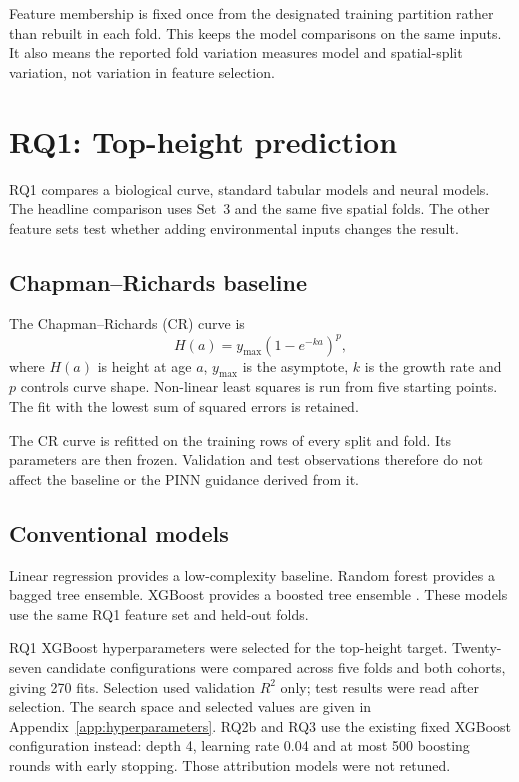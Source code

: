 Feature membership is fixed once from the designated training partition rather than rebuilt in
each fold. This keeps the model comparisons on the same inputs. It also means the reported fold
variation measures model and spatial-split variation, not variation in feature selection.

\section{RQ1: Top-height prediction}
\label{sec:rq1-method}

RQ1 compares a biological curve, standard tabular models and neural models. The headline
comparison uses Set~3 and the same five spatial folds. The other feature sets test whether adding
environmental inputs changes the result.

\subsection{Chapman--Richards baseline}

The Chapman--Richards (CR) curve is
\begin{equation}
H(a)=y_{\max}\left(1-e^{-ka}\right)^p,
\label{eq:cr}
\end{equation}
where $H(a)$ is height at age $a$, $y_{\max}$ is the asymptote, $k$ is the growth rate and $p$
controls curve shape. Non-linear least squares is run from five starting points. The fit with the
lowest sum of squared errors is retained.

The CR curve is refitted on the training rows of every split and fold. Its parameters are then
frozen. Validation and test observations therefore do not affect the baseline or the PINN
guidance derived from it.

\subsection{Conventional models}

Linear regression provides a low-complexity baseline. Random forest provides a bagged tree
ensemble. XGBoost provides a boosted tree ensemble \citep{chen2016XGBoost_C4_NN}. These models use
the same RQ1 feature set and held-out folds.

RQ1 XGBoost hyperparameters were selected for the top-height target. Twenty-seven candidate
configurations were compared across five folds and both cohorts, giving 270 fits. Selection used
validation $R^2$ only; test results were read after selection. The search space and selected values
are given in Appendix~\ref{app:hyperparameters}. RQ2b and RQ3 use the existing fixed XGBoost
configuration instead: depth 4, learning rate 0.04 and at most 500 boosting rounds with early
stopping. Those attribution models were not retuned.

